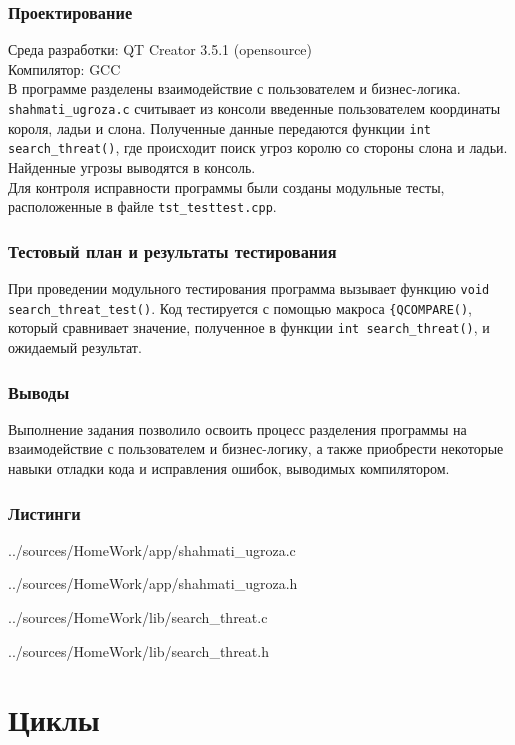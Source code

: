 \documentclass[12pt,a4paper]{report}
\begin{document}
\subsection{Проектирование}
Среда разработки: QT Creator 3.5.1 (opensource)
\\
Компилятор: GCC
\\
В программе разделены взаимодействие с пользователем и бизнес-логика. \verb+shahmati_ugroza.c+ считывает из консоли введенные пользователем координаты короля, ладьи и слона. Полученные данные передаются функции \verb+int search_threat()+, где происходит поиск угроз королю со стороны слона и ладьи. Найденные угрозы выводятся в консоль.
\\
Для контроля исправности программы были созданы модульные тесты, расположенные в файле \verb+tst_testtest.cpp+.

 
\subsection{Тестовый план и результаты тестирования}

При проведении модульного тестирования программа вызывает функцию \verb+void search_threat_test()+. Код тестируется с помощью макроса \verb+{QCOMPARE()+, который сравнивает значение, полученное в функции \verb+int search_threat()+, и ожидаемый результат. 
\subsection{Выводы}

Выполнение задания позволило освоить процесс разделения программы на взаимодействие с пользователем и бизнес-логику, а также приобрести некоторые навыки отладки кода и исправления ошибок, выводимых компилятором.

\subsection*{Листинги}


{../sources/HomeWork/app/shahmati_ugroza.c}


{../sources/HomeWork/app/shahmati_ugroza.h}


{../sources/HomeWork/lib/search_threat.c}


{../sources/HomeWork/lib/search_threat.h}


\chapter{Циклы}
\end{document}

